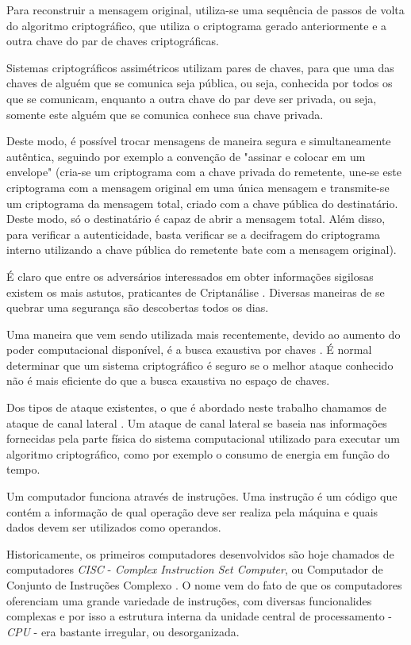 Para reconstruir a mensagem original, utiliza-se uma sequência de passos de
volta do algoritmo criptográfico, que utiliza o criptograma gerado anteriormente
e a outra chave do par de chaves criptográficas.

Sistemas criptográficos assimétricos utilizam pares de chaves, para que uma das
chaves de alguém que se comunica seja pública, ou seja, conhecida por todos os
que se comunicam, enquanto a outra chave do par deve ser privada, ou seja,
somente este alguém que se comunica conhece sua chave privada.

Deste modo, é possível trocar mensagens de maneira segura e simultaneamente
autêntica, seguindo por exemplo a convenção de "assinar e colocar em um
envelope" (cria-se um criptograma com a chave privada do remetente, une-se este
criptograma com a mensagem original em uma única mensagem e transmite-se um
criptograma da mensagem total, criado com a chave pública do destinatário. Deste
modo, só o destinatário é capaz de abrir a mensagem total. Além disso, para
verificar a autenticidade, basta verificar se a decifragem do criptograma
interno utilizando a chave pública do remetente bate com a mensagem original).

É claro que entre os adversários interessados em obter informações sigilosas
existem os mais astutos, praticantes de Criptanálise
\cite{cryptanalysis}. Diversas maneiras de se quebrar uma segurança são
descobertas todos os dias.

Uma maneira que vem sendo utilizada mais recentemente, devido ao aumento do
poder computacional disponível, é a busca exaustiva por chaves
\cite{agosta2012exploiting}. É normal determinar que um sistema criptográfico é
seguro se o melhor ataque conhecido não é mais eficiente do que a busca
exaustiva no espaço de chaves.

Dos tipos de ataque existentes, o que é abordado neste trabalho chamamos de
ataque de canal lateral \cite{mohamed2013improved}. Um ataque de canal lateral
se baseia nas informações fornecidas pela parte física do sistema computacional
utilizado para executar um algoritmo criptográfico, como por exemplo o consumo
de energia em função do tempo.


Um computador funciona através de instruções. Uma instrução é um código que
contém a informação de qual operação deve ser realiza pela máquina e quais dados
devem ser utilizados como operandos.

Historicamente, os primeiros computadores desenvolvidos são hoje chamados de
computadores \textit{CISC} - \textit{Complex Instruction Set Computer}, ou
Computador de Conjunto de Instruções Complexo \cite{chang1999customization}. O
nome vem do fato de que os computadores oferenciam uma grande variedade de
instruções, com diversas funcionalides complexas e por isso a estrutura interna
da unidade central de processamento - \textit{CPU} - era bastante irregular, ou
desorganizada.


